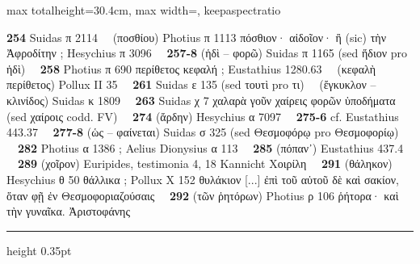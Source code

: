 \documentclass[11pt,twoside]{book}
\newcommand{\Eustathe}{Eustathius }
\newcommand{\AelDion}{Aelius Dionysius }
\newcommand{\espTest}{\ {\color{ruleGold}{\policeFr ∥}}\ }
\begin{document}
\begin{adjustbox}{max totalheight=30.4cm, max width=\textwidth, keepaspectratio}
\begin{minipage}{\textwidth}
{}
\vspace{3pt}
{\fontsize{8.0pt}{9.4pt}\selectfont
{} \textbf{254} Suidas π 2114 \espTest (ποσθίου) Photius π 1113 πόσθιον· αἰδοῖον· ἢ (sic) τὴν Ἀφροδίτην ; Hesychius π 3096 \espTest \textbf{257-8} (ἡδὶ -- φορῶ) Suidas π 1165 (sed ἥδιον pro ἡδὶ) \espTest \textbf{258} Photius π 690 περίθετος κεφαλή ; \Eustathe 1280.63 \espTest (κεφαλὴ περίθετος) Pollux II 35 \espTest \textbf{261} Suidas ε 135 (sed τουτὶ pro τι) \espTest (ἔγκυκλον -- κλινίδος) Suidas κ 1809 \espTest \textbf{263} Suidas χ 7 χαλαρὰ γοῦν χαίρεις φορῶν ὑποδήματα (sed χαίροις codd. FV) \espTest \textbf{274} (ἄρδην) Hesychius α 7097 \espTest \textbf{275-6} cf. \Eustathe 443.37 \espTest \textbf{277-8} (ὡς -- φαίνεται) Suidas σ 325 (sed Θεσμοφόρῳ pro Θεσμοφορίῳ) \espTest \textbf{282} Photius α 1386 ; \AelDion α 113 \espTest \textbf{285} (πόπαν᾽) \Eustathe 437.4 \espTest \textbf{289} (χοῖρον) Euripides, testimonia 4, 18 Kannicht Χοιρίλη \espTest \textbf{291} (θάληκον) Hesychius θ 50 θάλλικα ; Pollux X 152 θυλάκιον [...] ἐπὶ τοῦ αὐτοῦ δὲ καὶ σακίον, ὅταν φῇ ἐν Θεσμοφοριαζούσαις \espTest \textbf{292} (τῶν ῥητόρων) Photius ρ 106 ῥήτορα· καὶ τὴν γυναῖκα. Ἀριστοφάνης\par\vspace{2.5pt}
{\color{ruleGold}\hrule height 0.35pt}\vspace{2.5pt}
}
\end{minipage}
\end{adjustbox}
\end{document}
